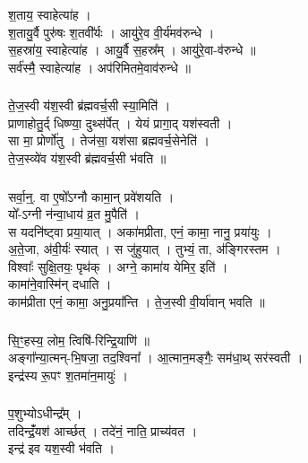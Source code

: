 \subsubsection{}
श॒ताय॒ स्वाहेत्या॑ह ।\\
श॒तायु॒र्वै पुरु॑षः श॒तवी᳚र्यः । आयु॑रे॒व वी॒र्य॑मव॑रुन्धे ।\\
स॒हस्रा॑य॒ स्वाहेत्या॑ह । आयु॒र्वै स॒हस्र᳚म् । आयु॑रे॒वा-व॑रुन्धे ॥\\
सर्व॑स्मै॒ स्वाहेत्या॑ह । अप॑रिमितमे॒वाव॑रुन्धे ॥\\
\subsubsection{}
ते॒ज॒स्वी य॑श॒स्वी ब्र॑ह्मवर्च॒सी स्या॒मिति॑ ।\\
प्राणाहोतु॒र्द् धिष्ण्या॒ दुथ्स॑र्पेत् । येयं प्रागा॒द् यश॑स्वती ।\\
सा मा॒ प्रोर्णो॑तु । तेज॑सा॒ यश॑सा ब्रह्मवर्च॒सेनेति॑ ।\\
ते॒ज॒स्व्ये॑व य॑श॒स्वी ब्र॑ह्मवर्च॒सी भ॑वति ॥\\
\subsubsection{}
सर्वा॒न्॒. वा ए॒षो᳚ऽग्नौ कामा॒न् प्रवे॑शयति ।\\
यो᳚-ऽग्नी न॑न्वा॒धाय॑ व्र॒त मु॒पैति॑ ।\\
स यदनि॑ष्ट्वा प्रया॒यात् । अका॑मप्रीता, एनं॒ कामा॒ नानु॒ प्रया॑युः ।\\
अ॒ते॒जा, अ॑वी॒र्यः॑ स्यात् । स जु॑हुयात् । तुभ्यं॒ ता, अ॑ङ्गिरस्तम ।\\
विश्वाः᳚ सुक्षि॒तयः॒ पृथ॑क् । अग्ने॒ कामा॑य येमिर॒ इति॑ ।\\
कामा॑ने॒वास्मि॑न् दधाति ।\\
काम॑प्रीता एनं॒ कामा॒ अनु॒प्रया᳚न्ति । ते॒ज॒स्वी वी॒र्या॑वान् भवति ॥\\
\subsubsection{}
सि॒ꣳ॒हस्य॒ लोम॒ त्विषि॑-रिन्द्रि॒याणि॑ ॥\\
अङ्गा᳚न्या॒त्मन्-भि॒षजा॒ तद॒श्विना᳚ । आ॒त्मान॒मङ्गैः॒ सम॑धा॒थ् सर॑स्वती ।\\
इन्द्र॑स्य रू॒पꣳ श॒तमा॑न॒मायुः॑ ।\\
\subsubsection{}
प॒शुभ्योऽधीन्द्र᳚म् ।\\
तदिन्द्रंँ॒यश॑ आर्च्छत् । तदे॑नं॒ नाति॒ प्राच्य॑वत ।\\
इन्द्र॑ इव यश॒स्वी भ॑वति ।\\
